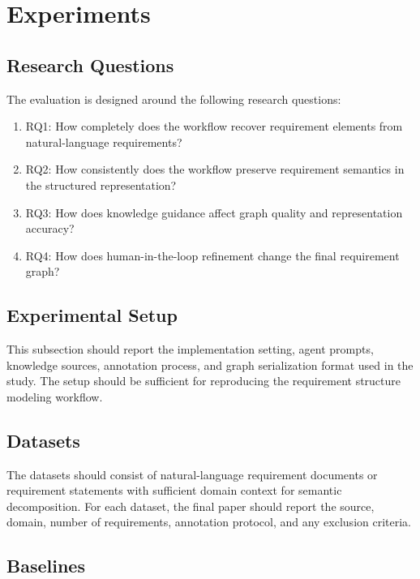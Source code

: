 \section{Experiments}
\label{experiments}

\subsection{Research Questions}
\label{sec:exp-rqs}

The evaluation is designed around the following research questions:
\begin{enumerate}[leftmargin=*]
  \item RQ1: How completely does the workflow recover requirement elements from natural-language requirements?
  \item RQ2: How consistently does the workflow preserve requirement semantics in the structured representation?
  \item RQ3: How does knowledge guidance affect graph quality and representation accuracy?
  \item RQ4: How does human-in-the-loop refinement change the final requirement graph?
\end{enumerate}

\subsection{Experimental Setup}
\label{sec:exp-setup}

This subsection should report the implementation setting, agent prompts, knowledge sources, annotation process, and graph serialization format used in the study.
The setup should be sufficient for reproducing the requirement structure modeling workflow.

\subsection{Datasets}
\label{sec:exp-datasets}

The datasets should consist of natural-language requirement documents or requirement statements with sufficient domain context for semantic decomposition.
For each dataset, the final paper should report the source, domain, number of requirements, annotation protocol, and any exclusion criteria.

\subsection{Baselines}
\label{sec:exp-baselines}

